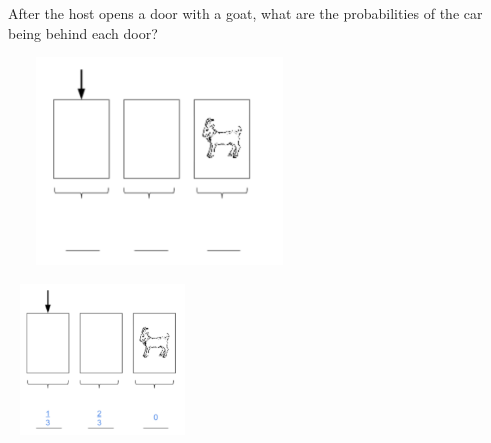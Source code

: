 After the host opens a door with a goat, what are the probabilities of 
the car being behind each door?
\begin{center}
\includegraphics[width=8cm, height=5.5cm]{intro_doors_2.jpg}
\end{center}
\begin{solution}
\begin{center}
\includegraphics[width=5cm, height=4cm]{intro_doors_2_sol.jpg}
\end{center}
 \end{solution}